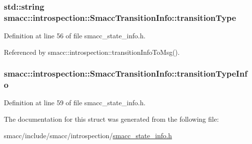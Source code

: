 \subsubsection[{\texorpdfstring{transition\+Type}{transitionType}}]{\setlength{\rightskip}{0pt plus 5cm}std\+::string smacc\+::introspection\+::\+Smacc\+Transition\+Info\+::transition\+Type}\hypertarget{structsmacc_1_1introspection_1_1SmaccTransitionInfo_a8f4682c18a3b6c09f6b942a4fa7b524d}{}\label{structsmacc_1_1introspection_1_1SmaccTransitionInfo_a8f4682c18a3b6c09f6b942a4fa7b524d}


Definition at line 56 of file smacc\+\_\+state\+\_\+info.\+h.



Referenced by smacc\+::introspection\+::transition\+Info\+To\+Msg().

\subsubsection[{\texorpdfstring{transition\+Type\+Info}{transitionTypeInfo}}]{ smacc\+::introspection\+::\+Smacc\+Transition\+Info\+::transition\+Type\+Info}\hypertarget{structsmacc_1_1introspection_1_1SmaccTransitionInfo_a98364c74dec9e1cf1337743ce0771a33}{}\label{structsmacc_1_1introspection_1_1SmaccTransitionInfo_a98364c74dec9e1cf1337743ce0771a33}


Definition at line 59 of file smacc\+\_\+state\+\_\+info.\+h.



The documentation for this struct was generated from the following file\+:\begin{DoxyCompactItemize}
\item 
smacc/include/smacc/introspection/\hyperlink{smacc__state__info_8h}{smacc\+\_\+state\+\_\+info.\+h}\end{DoxyCompactItemize}
